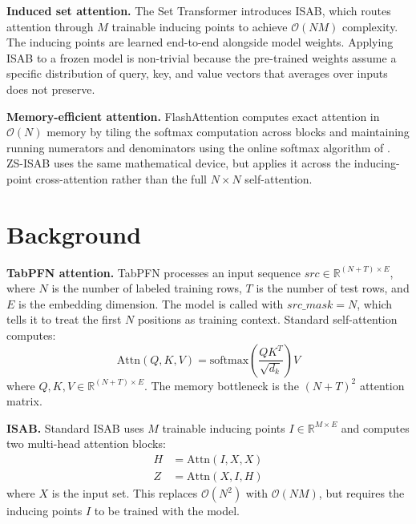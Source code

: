\documentclass{article}
\begin{document}
\textbf{Induced set attention.}
The Set Transformer \citep{lee2019set} introduces ISAB, which routes attention through $M$ trainable inducing points to achieve $\mathcal{O}(NM)$ complexity. The inducing points are learned end-to-end alongside model weights. Applying ISAB to a frozen model is non-trivial because the pre-trained weights assume a specific distribution of query, key, and value vectors that averages over inputs does not preserve.

\textbf{Memory-efficient attention.}
FlashAttention \citep{dao2022flashattention} computes exact attention in $\mathcal{O}(N)$ memory by tiling the softmax computation across blocks and maintaining running numerators and denominators using the online softmax algorithm of \citet{milakov2018online}. ZS-ISAB uses the same mathematical device, but applies it across the inducing-point cross-attention rather than the full $N \times N$ self-attention.

\section{Background}

\textbf{TabPFN attention.}
TabPFN processes an input sequence $src \in \mathbb{R}^{(N+T) \times E}$, where $N$ is the number of labeled training rows, $T$ is the number of test rows, and $E$ is the embedding dimension. The model is called with $src\_mask = N$, which tells it to treat the first $N$ positions as training context. Standard self-attention computes:
\begin{equation}
    \text{Attn}(Q, K, V) = \text{softmax}\!\left(\frac{QK^T}{\sqrt{d_k}}\right)V
\end{equation}
where $Q, K, V \in \mathbb{R}^{(N+T) \times E}$. The memory bottleneck is the $(N+T)^2$ attention matrix.

\textbf{ISAB.}
Standard ISAB \citep{lee2019set} uses $M$ trainable inducing points $I \in \mathbb{R}^{M \times E}$ and computes two multi-head attention blocks:
\begin{align}
    H &= \text{Attn}(I, X, X) \\
    Z &= \text{Attn}(X, I, H)
\end{align}
where $X$ is the input set. This replaces $\mathcal{O}(N^2)$ with $\mathcal{O}(NM)$, but requires the inducing points $I$ to be trained with the model.

\end{document}
